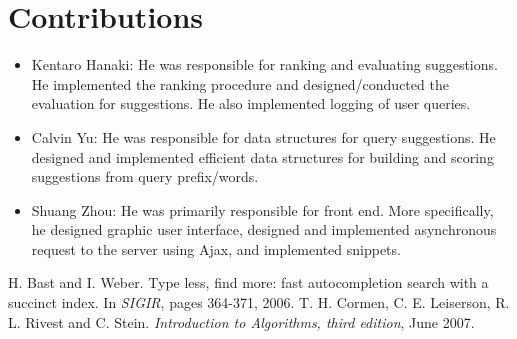 \documentclass{article}
\begin{document}
\section{Contributions}

\begin{itemize}
\item Kentaro Hanaki: He was responsible for ranking and evaluating suggestions. He implemented the ranking procedure and designed/conducted the evaluation for suggestions. He also implemented logging of user queries.
\item Calvin Yu: He was responsible for data structures for query suggestions. He designed and implemented efficient data structures for building and scoring suggestions from query prefix/words.
\item Shuang Zhou: He was primarily responsible for front end. More specifically, he designed graphic user interface, designed and implemented asynchronous request to the server using Ajax, and implemented snippets.
\end{itemize}


\begin{thebibliography}{1}

 H. Bast and I. Weber. Type less, find more: fast autocompletion search with a succinct index. In {\em SIGIR}, pages 364-371, 2006.
 T. H. Cormen, C. E. Leiserson, R. L. Rivest and C. Stein. {\em Introduction to Algorithms, third edition}, June 2007.

\end{thebibliography}
\end{document}
